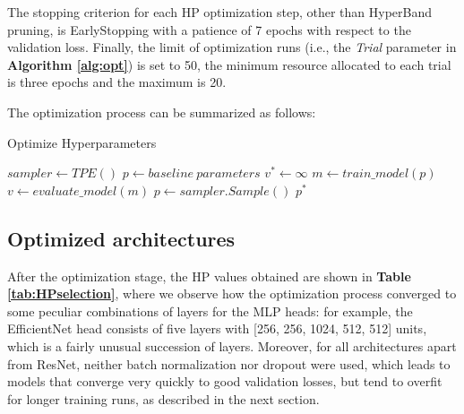 \noindent
The stopping criterion for each HP optimization step, other than HyperBand pruning, is EarlyStopping with a patience of 7 epochs with respect to the validation loss. Finally, the limit of optimization runs (i.e., the \textit{Trial} parameter in \textbf{Algorithm \ref{alg:opt}}) is set to 50, the minimum resource allocated to each trial is three epochs and the maximum is 20. 

\noindent
The optimization process can be summarized as follows:
\begin{algorithm}[ht!]
\caption{Optimize Hyperparameters}\label{alg:opt}
    $sampler \leftarrow TPE()$\;
    $p \leftarrow baseline\ parameters$\;
    $v^* \leftarrow \infty$\;
    {
        $m \leftarrow train\_model(p)$
        $v \leftarrow evaluate\_model(m)$
        $p \leftarrow sampler.Sample()$\;
    }
    \Return $p^*$
\end{algorithm}


\subsection{Optimized architectures} %


\noindent
After the optimization stage, the HP values obtained are shown in \textbf{Table \ref{tab:HPselection}}, where we observe how the optimization process converged to some peculiar combinations of layers for the MLP heads: for example, the EfficientNet head consists of five layers with [256, 256, 1024, 512, 512] units, which is a fairly unusual succession of layers. Moreover, for all architectures apart from ResNet, neither batch normalization nor dropout were used, which leads to models that converge very quickly to good validation losses, but tend to overfit for longer training runs, as described in the next section.

